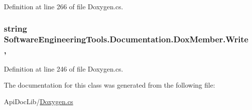 Definition at line 266 of file Doxygen.\+cs.

\hypertarget{class_software_engineering_tools_1_1_documentation_1_1_dox_member_a1365d972474a2979c3b743adab712344}{
\subsubsection[{Write}]{\setlength{\rightskip}{0pt plus 5cm}string Software\+Engineering\+Tools.\+Documentation.\+Dox\+Member.\+Write\hspace{0.3cm}{\ttfamily [get]}, {\ttfamily [set]}}}\label{class_software_engineering_tools_1_1_documentation_1_1_dox_member_a1365d972474a2979c3b743adab712344}


Definition at line 246 of file Doxygen.\+cs.



The documentation for this class was generated from the following file\+:\begin{DoxyCompactItemize}
\item 
Api\+Doc\+Lib/\hyperlink{_doxygen_8cs}{Doxygen.\+cs}\end{DoxyCompactItemize}
